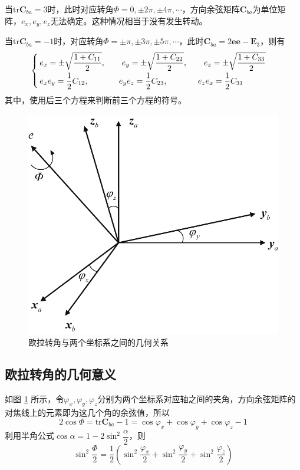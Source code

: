 \noa[2] 当$\text{tr} \bm{C}_{ba} = 3$时，此时对应转角$\varPhi = 0, \pm 2 \pi, \pm 4 \pi, \cdots$，方向余弦矩阵$\bm{C}_{ba}$为单位矩阵，$e_x, e_y, e_z$无法确定。这种情况相当于没有发生转动。

\noa[3] 当$\text{tr} \bm{C}_{ba} = -1$时，对应转角$\varPhi = \pm \pi, \pm 3 \pi, \pm 5 \pi, \cdots$，此时$\bm{C}_{ba} = 2 \bm{e}\bm{e} - \bm{E}_3$，则有
\begin{equation}
	\begin{cases}
		\, e_x = \pm \sqrt{\dfrac{1 + C_{11}}{2}}, \qquad e_y = \pm \sqrt{\dfrac{1+ C_{22}}{2}}, \qquad e_z = \pm \sqrt{\dfrac{1 + C_{33}}{2}} \\[0.5em]
		\, e_x e_y = \dfrac{1}{2} C_{12}, \hspace*{3.7em} e_ye_z = \dfrac{1}{2}C_{23}, \hspace*{3.7em} e_ze_x = \dfrac{1}{2} C_{31}
	\end{cases}
\end{equation}
其中，使用后三个方程来判断前三个方程的符号。

\begin{figure}[!htb]
	\centering
	\includegraphics[width=0.42\linewidth]{pic/欧拉轴角变换}
	\vspace*{-1em}
	\caption{欧拉转角与两个坐标系之间的几何关系}
	\label{欧拉转角变换}
\end{figure}
\vspace*{-1.8em}

\subsection{欧拉转角的几何意义}

如图 \ref{欧拉转角变换} 所示，令$\varphi_x, \varphi_y, \varphi_z$分别为两个坐标系对应轴之间的夹角，方向余弦矩阵的对焦线上的元素即为这几个角的余弦值，所以
\begin{equation}
	2 \cos \varPhi = \text{tr} \bm{C}_{ba} - 1 = \cos \varphi_x + \cos \varphi_y + \cos \varphi_z - 1
\end{equation}
利用半角公式$\cos \alpha = 1 - 2 \sin^2 \dfrac{\alpha}{2}$，则
\begin{equation}
	\sin^2 \dfrac{\varPhi}{2} = \dfrac{1}{2} \left( \sin^2 \dfrac{\varphi_x}{2} + \sin^2 \dfrac{\varphi_y}{2} + \sin^2 \dfrac{\varphi_z}{2} \right)
\end{equation}

